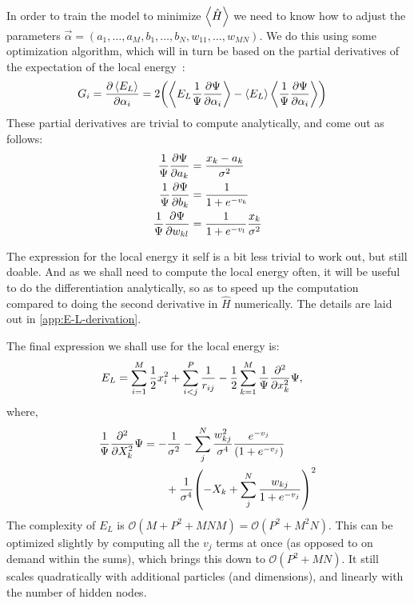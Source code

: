 \documentclass[a4paper, 11pt]{article}
\begin{document}
\begin{multicols}{2}
    In order to train the model to minimize $\expval{\hat H}$ we need to know
    how to adjust the parameters $\vec\alpha = (a_1,\dots,a_M,
    b_1,\dots,b_N,w_{11},\dots,w_{MN})$. We do this using some optimization
    algorithm, which will in turn be based on the partial derivatives of the
    expectation of the local energy~\cite{mhj-compphys-II}:
    \begin{align}
            G_i &= \pdv{\expval{E_L}}{\alpha_i} 
            = 2\qty(\expval{E_L
        \frac{1}{\Psi}\pdv{\Psi}{\alpha_i}} -
        \expval{E_L}\expval{\frac{1}{\Psi}\pdv{\Psi}{\alpha_i}})
    \end{align}
    These partial derivatives are trivial to compute analytically, and come out as
    follows:
    \begin{align}
        \frac{1}{\Psi}\pdv{\Psi}{a_k} &=
        \frac{x_k-a_k}{\sigma^2}\label{eq:pdv-a}\\
        \frac{1}{\Psi}\pdv{\Psi}{b_k} &= \frac{1}{1 +
        e^{-v_k}}\label{eq:pdv-b}\\
        \frac{1}{\Psi}\pdv{\Psi}{w_{kl}} &= \frac{1}{1 +
        e^{-v_l}}\frac{x_k}{\sigma^2}
    \end{align}

    The expression for the local energy it self is a bit less trivial to work
    out, but still doable. And as we shall need to compute the local energy often,
    it will be useful to do the differentiation analytically, so as to speed up
    the computation compared to doing the second derivative in $\hat H$
    numerically. The details are laid out in \autoref{app:E-L-derivation}.

    The final expression we shall use for the local energy is:
    \begin{align}
        E_L &= \sum_{i=1}^M \frac{1}{2}x_i^2 + \sum_{i<j}^{P} \frac{1}{r_{ij}}
        - \frac{1}{2} \sum_{k=1}^M
        \frac{1}{\Psi}\pdv[2]{}{x_k}\Psi,\label{eq:E-L-final-main-section}
    \end{align}
    where,
    \begin{align}
        \begin{split}
        \frac{1}{\Psi}\pdv[2]{}{X_k}\Psi 
        &= -\frac{1}{\sigma^2} - \sum_j^N
        \frac{w_{kj}^2}{\sigma^4}
        \frac{e^{-v_j}}{\qty(1+e^{-v_j})} \\
        &\quad{   }\quad{      }  +
        \frac{1}{\sigma^4}\qty(-X_k+\sum_j^N \frac{w_{kj}}{1+e^{-v_j}})^2
        \end{split}
        \label{eq:E-L-second-deriv-main-section}
    \end{align}
    The complexity of $E_L$ is $\mathcal{O}(M + P^2 + MNM) = \mathcal{O}(P^2 +
    M^2 N)$. This can be optimized slightly by computing all the $v_j$ terms at
    once (as opposed to on demand within the sums), which brings this down to
    $\mathcal{O}(P^2 + MN)$. It still scales quadratically with additional
    particles (and dimensions), and linearly with the number of hidden nodes.


\end{multicols}
\end{document}
